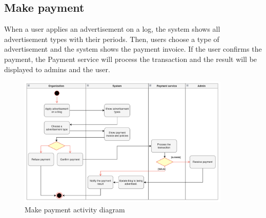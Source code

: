\subsection{Make payment}
When a user applies an advertisement on a log, the system shows all advertisement types with their periods. Then, users choose a type of advertisement and the system shows the payment invoice. If the user confirms the payment, the Payment service will process the transaction and the result will be displayed to admins and the user.
\begin {figure}[H]
\centering
\includegraphics[width=0.9\textwidth]{Figures/payment.png}
\caption{Make payment activity diagram}
\label{fig:make-payment}
\end{figure}
\newpage